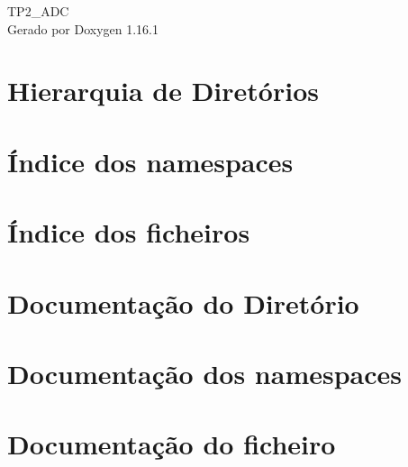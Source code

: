 \documentclass[twoside]{book}
\newcommand{\+}{\discretionary{\mbox{\scriptsize$\hookleftarrow$}}{}{}}
\newcommand{\clearemptydoublepage}{%
    \newpage{\pagestyle{empty}\cleardoublepage}%
  }
\begin{document}
  \raggedbottom
    \hypersetup{pageanchor=false,
                bookmarksnumbered=true,
                pdfencoding=unicode
               }
  \begin{titlepage}
  \vspace*{7cm}
  \begin{center}%
  {\Large TP2\+\_\+\+ADC}\\
  \vspace*{1cm}
  {\large Gerado por Doxygen 1.16.1}\\
  \end{center}
  \end{titlepage}
  \clearemptydoublepage
  \tableofcontents
  \clearemptydoublepage
  \hypersetup{pageanchor=true}
\chapter{Hierarquia de Diretórios}

\chapter{Índice dos namespaces}

\chapter{Índice dos ficheiros}

\chapter{Documentação do Diretório}

\chapter{Documentação dos namespaces}





\chapter{Documentação do ficheiro}





  \backmatter
  \newpage
  \clearemptydoublepage
  \printindex
\end{document}
